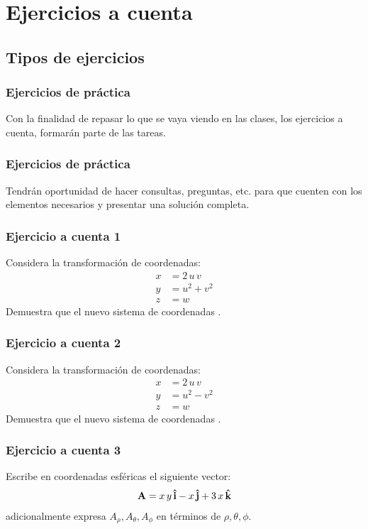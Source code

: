 \documentclass[12pt]{beamer}
\begin{document}
\section{Ejercicios a cuenta}
\subsection{Tipos de ejercicios}

\begin{frame}
\frametitle{Ejercicios de práctica}
Con la finalidad de repasar lo que se vaya viendo en las clases, los ejercicios a cuenta, formarán parte de las tareas.
\end{frame}
\begin{frame}
\frametitle{Ejercicios de práctica}
Tendrán oportunidad de hacer consultas, preguntas, etc. para que cuenten con los elementos necesarios y presentar una solución completa.
\end{frame}
\begin{frame}
\frametitle{Ejercicio a cuenta 1}
Considera la transformación de coordenadas:
\begin{align*}
x &= 2 \, u \, v \\[0.5em]
y &= u^{2} + v^{2} \\[0.5em]
z &= w
\end{align*}
Demuestra que el nuevo sistema de coordenadas .
\end{frame}
\begin{frame}
\frametitle{Ejercicio a cuenta 2}
Considera la transformación de coordenadas:
\begin{align*}
x &= 2 \, u \, v \\[0.5em]
y &= u^{2} - v^{2} \\[0.5em]
z &= w
\end{align*}
Demuestra que el nuevo sistema de coordenadas .
\end{frame}
\begin{frame}
\frametitle{Ejercicio a cuenta 3}
Escribe en coordenadas esféricas el siguiente vector:
\begin{align*}
\vb{A} = x \, y \, \vu{i} - x \, \vu{j} + 3 \, x \, \vu{k}
\end{align*}
adicionalmente expresa $A_{\rho}, A_{\theta}, A_{\phi}$ en términos de $\rho, \theta, \phi$.
\end{frame}
\end{document}
